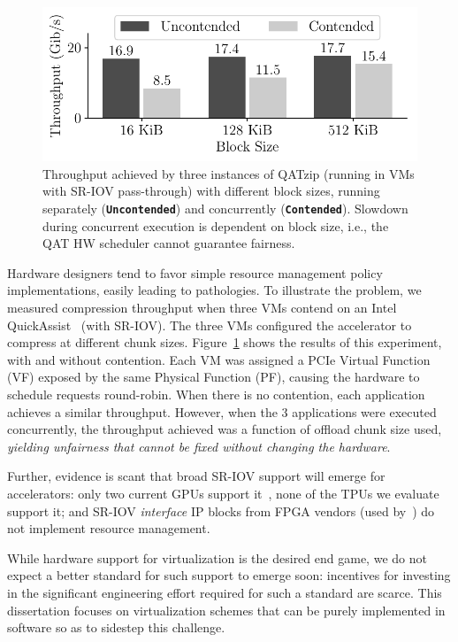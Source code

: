 \begin{figure}[!t]
	\centering
  \vspace{-0.5em}
	\includegraphics[width=.75\linewidth]{figures/qat_unfairness.pdf}
    \vspace{-.2cm}
	\caption{Throughput achieved by three instances of QATzip (running in VMs with SR-IOV pass-through) with different block sizes, running separately (\textbf{\texttt{Uncontended}}) and concurrently (\textbf{\texttt{Contended}}). Slowdown during concurrent execution is dependent on block size, i.e., the QAT HW scheduler cannot guarantee fairness.}
	\label{fig:qat-unfairness}
\end{figure}

Hardware designers tend to favor simple resource management policy
implementations, easily leading to pathologies. To illustrate the problem, we
measured compression throughput when three VMs contend on an Intel
QuickAssist~\cite{QAT} (with SR-IOV). The three VMs configured the accelerator
to compress at different chunk sizes. Figure~\ref{fig:qat-unfairness} shows
the results of this experiment, with and without contention. Each VM was
assigned a PCIe Virtual Function (VF) exposed by the same Physical Function
(PF), causing the hardware to schedule requests round-robin. When there is no
contention, each application achieves a similar throughput. However, when the
3 applications were executed concurrently, the throughput achieved was a
function of offload chunk size used, \emph{yielding unfairness that cannot be
fixed without changing the hardware}.

Further, evidence is scant that broad SR-IOV support will emerge for
accelerators: only two current GPUs support it~\cite{amdfirepro,nvidiagrid},
none of the TPUs we evaluate support it; and SR-IOV \emph{interface} IP blocks
from FPGA vendors (used by~\cite{vu2014enabling,zazo2015pcie,vfpgamanager,
huang2009fpgavirt}) do not implement resource management.

While hardware support for virtualization is the desired end game, we do not
expect a better standard for such support to emerge soon: incentives for
investing in the significant engineering effort required for such a standard
are scarce. This dissertation focuses on virtualization schemes that can be purely implemented in software so as to sidestep this challenge.